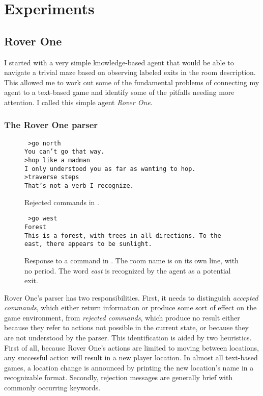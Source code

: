 \section{Experiments}

\subsection{Rover One}

I started with a very simple knowledge-based agent that would be able to
navigate a trivial maze based on observing labeled exits in the room
description. This allowed me to work out some of the fundamental
problems of connecting my agent to a text-based game and identify some
of the pitfalls needing more attention. I called this simple agent
\emph{Rover One}. 

\subsubsection{The Rover One parser}

\begin{wrapfigure}{R}{.45\textwidth}
    \raggedright
    \texttt{
        >go north\\
        You can't go that way.\\
        >hop like a madman\\
        I only understood you as far as wanting to hop.\\
        >traverse steps\\
        That's not a verb I recognize.
    }
        \caption{\small Rejected commands in
        \cite{nelson_curses_1993}.}
        \smallskip
    \raggedright
    \texttt{
        >go west\\
        Forest\\
        This is a forest, with trees in all directions. To the east,
    there appears to be sunlight.}

    \caption{\small Response to a command in \cite{blank_zork_1980}. The room
    name is on its own line, with no period. The word \emph{east} is
recognized by the agent as a potential exit.}
\end{wrapfigure}

Rover One's parser has two responsibilities. First, it needs to
distinguish \emph{accepted commands}, which either return information
or produce some sort of effect on the game environment, from
\emph{rejected commands}, which produce no result either because they
refer to actions not possible in the current state, or because they
are not understood by the parser. This identification is aided by two
heuristics. First of all, because Rover One's actions are limited to
moving between locations, any successful action will result in a new
player location. In almost all text-based games, a location change is
announced by printing the new location's name in a recognizable format.
Secondly, rejection messages are generally brief with commonly occurring
keywords.

